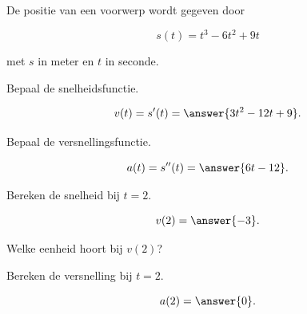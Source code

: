 \documentclass{ximera}
\begin{document}
\begin{oefening}[Beweging]{\oefU \ESS}

De positie van een voorwerp wordt gegeven door

\[
s(t)=t^3-6t^2+9t
\]

met $s$ in meter en $t$ in seconde.

\begin{question}

Bepaal de snelheidsfunctie.

\[
v(t)=s'(t)=\answer{3t^2-12t+9}.
\]

\end{question}

\begin{question}

Bepaal de versnellingsfunctie.

\[
a(t)=s''(t)=\answer{6t-12}.
\]

\end{question}

\begin{question}

Bereken de snelheid bij $t=2$.

\[
v(2)=\answer{-3}.
\]

\end{question}

\begin{question}

Welke eenheid hoort bij $v(2)$?

\begin{multipleChoice}
\end{multipleChoice}

\end{question}

\begin{question}

Bereken de versnelling bij $t=2$.

\[
a(2)=\answer{0}.
\]

\end{question}

\end{oefening}







\end{document}
